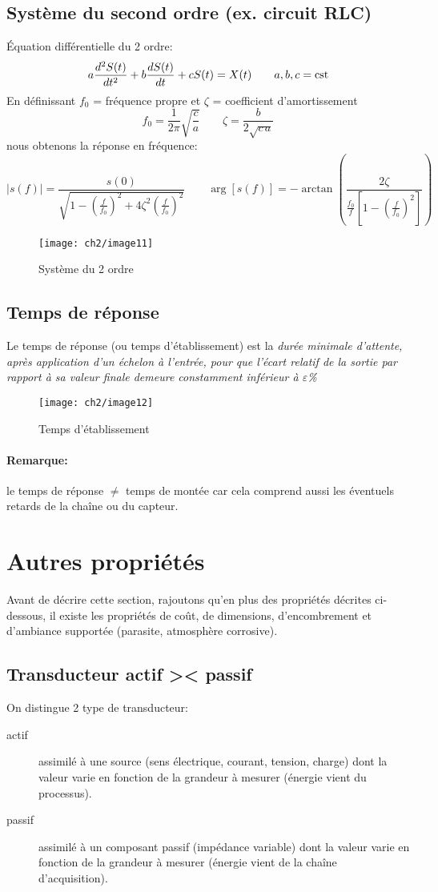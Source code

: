 \subsection{Système du second ordre (ex. circuit RLC)}
Équation différentielle du 2 ordre:
\[
a\frac{d^2 S(t)}{dt^2} + b \frac{d S(t)}{dt} + cS(t) = X(t)\qquad a,b,c=\text{cst}
\]
En définissant \(f_0\) = fréquence propre et \(\zeta\) = coefficient d'amortissement
\[
f_0 = \frac{1}{2\pi}\sqrt{\frac{c}{a}}\qquad \zeta=\frac{b}{2\sqrt{c\,a}}
\]
nous obtenons la réponse en fréquence:
\[
|s(f)|=\frac{s(0)}{\sqrt{1-\left(\frac{f}{f_0}\right)^2+4\zeta^2\left(\frac{f}{f_0}\right)^2}}\qquad \arg[s(f)] = -\arctan\left(\frac{2\zeta}{\frac{f_0}{f}\left[1-\left(\frac{f}{f_0}\right)^2\right]}\right)
\]

\begin{figure}[H] 
	\centering 
	\texttt{[image: ch2/image11]} 
	\caption{Système du 2 ordre} 
\end{figure}
\subsection{Temps de réponse}
Le temps de réponse (ou temps d'établissement) est la \emph{durée minimale d'attente, après application d'un échelon à l'entrée, pour que l'écart relatif de la sortie par rapport à sa valeur finale demeure constamment inférieur à \(\varepsilon\)\%}
\begin{figure}[H] 
	\centering 
	\texttt{[image: ch2/image12]} 
	\caption{Temps d'établissement} 
	\label{fig:tempsétabliss}
\end{figure}
\paragraph{Remarque:} le temps de réponse \(\neq\) temps de montée car cela comprend aussi les éventuels retards de la chaîne ou du capteur.
\section{Autres propriétés}
Avant de décrire cette section, rajoutons qu'en plus des propriétés décrites ci-dessous, il existe les propriétés de coût, de dimensions, d'encombrement et d'ambiance supportée (parasite, atmosphère corrosive).
\subsection{Transducteur actif >< passif}
On distingue 2 type de transducteur:
\begin{description}
	\item[actif] assimilé à une source (sens électrique, courant, tension, charge) dont la valeur varie en fonction de la grandeur à mesurer (énergie vient du processus).
	\item[passif] assimilé à un composant passif (impédance variable) dont la valeur varie en fonction de la grandeur à mesurer (énergie vient de la chaîne d'acquisition).
\end{description}
